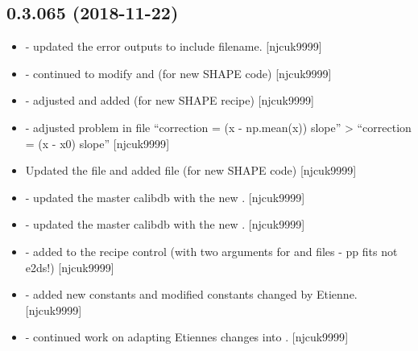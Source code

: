 \documentclass[a4paper,10pt,english]{report}
\begin{document}
\subsection{0.3.065 (2018-11-22)}
\label{\detokenize{misc/changelog:id258}}\begin{itemize}
\item {} 
 - updated the error outputs to include filename.
{[}njcuk9999{]}

\item {} 
 - continued to modify  and 
(for new SHAPE code) {[}njcuk9999{]}

\item {} 
 - adjusted  and added
 (for new SHAPE recipe) {[}njcuk9999{]}

\item {} 
 - adjusted problem in  file “correction = (x
- np.mean(x)) \sphinxtitleref{*} slope” \textendash{}\textgreater{} “correction = (x - x0) \sphinxtitleref{*} slope” {[}njcuk9999{]}

\item {} 
Updated the  file and added  file
(for new SHAPE code) {[}njcuk9999{]}

\item {} 
 - updated the master calibdb with the new
. {[}njcuk9999{]}

\item {} 
 - updated the master calibdb with the new
. {[}njcuk9999{]}

\item {} 
 - added  to the recipe control
(with two arguments for  and  files - pp fits not e2ds!)
{[}njcuk9999{]}

\item {} 
 - added new constants and modified constants
changed by Etienne. {[}njcuk9999{]}

\item {} 
 - continued work on adapting Etiennes changes
into . {[}njcuk9999{]}

\end{itemize}
\end{document}
